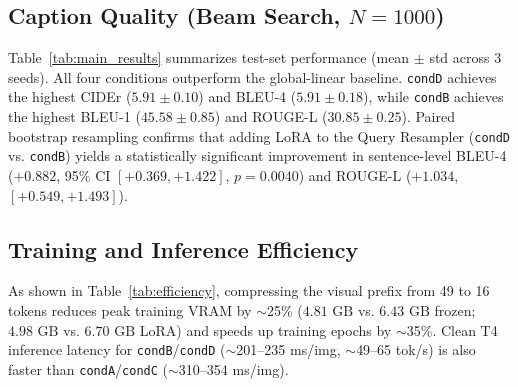 \documentclass[conference]{IEEEtran}
\begin{document}
\subsection{Caption Quality (Beam Search, $N=1000$)}
Table~\ref{tab:main_results} summarizes test-set performance (mean $\pm$ std across 3 seeds). All four conditions outperform the global-linear baseline. \texttt{condD} achieves the highest CIDEr ($5.91 \pm 0.10$) and BLEU-4 ($5.91 \pm 0.18$), while \texttt{condB} achieves the highest BLEU-1 ($45.58 \pm 0.85$) and ROUGE-L ($30.85 \pm 0.25$). Paired bootstrap resampling confirms that adding LoRA to the Query Resampler (\texttt{condD} vs. \texttt{condB}) yields a statistically significant improvement in sentence-level BLEU-4 ($+0.882$, 95\% CI $[+0.369, +1.422]$, $p=0.0040$) and ROUGE-L ($+1.034$, $[+0.549, +1.493]$).

\begin{table}[t]
\centering
\caption{Test-Set Caption Quality (Beam=5, Mean $\pm$ Std across 3 Seeds)}
\label{tab:main_results}
\end{table}

\subsection{Training and Inference Efficiency}
As shown in Table~\ref{tab:efficiency}, compressing the visual prefix from 49 to 16 tokens reduces peak training VRAM by $\sim$25\% ($4.81\text{ GB}$ vs. $6.43\text{ GB}$ frozen; $4.98\text{ GB}$ vs. $6.70\text{ GB}$ LoRA) and speeds up training epochs by $\sim$35\%. Clean T4 inference latency for \texttt{condB}/\texttt{condD} ($\sim$201--235 ms/img, $\sim$49--65 tok/s) is also faster than \texttt{condA}/\texttt{condC} ($\sim$310--354 ms/img).
\end{document}
